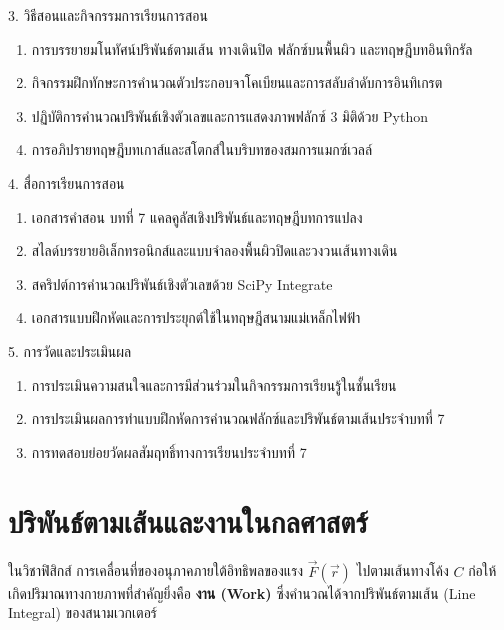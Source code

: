 \newpage

\begin{planbox}[colframe=rbruNavy!85!black, colbacktitle=rbruNavy!85!black]{3. วิธีสอนและกิจกรรมการเรียนการสอน}
\begin{enumerate}[topsep=2pt, itemsep=1pt, partopsep=0pt, parsep=0pt, leftmargin=1.5em]
    \item การบรรยายมโนทัศน์ปริพันธ์ตามเส้น ทางเดินปิด ฟลักซ์บนพื้นผิว และทฤษฎีบทอินทิกรัล
    \item กิจกรรมฝึกทักษะการคำนวณตัวประกอบจาโคเบียนและการสลับลำดับการอินทิเกรต
    \item ปฏิบัติการคำนวณปริพันธ์เชิงตัวเลขและการแสดงภาพฟลักซ์ 3 มิติด้วย Python
    \item การอภิปรายทฤษฎีบทเกาส์และสโตกส์ในบริบทของสมการแมกซ์เวลล์
\end{enumerate}
\end{planbox}

\begin{planbox}[colframe=rbruGold!90!black, colbacktitle=rbruGold!90!black]{4. สื่อการเรียนการสอน}
\begin{enumerate}[topsep=2pt, itemsep=1pt, partopsep=0pt, parsep=0pt, leftmargin=1.5em]
    \item เอกสารคำสอน บทที่ 7 แคลคูลัสเชิงปริพันธ์และทฤษฎีบทการแปลง
    \item สไลด์บรรยายอิเล็กทรอนิกส์และแบบจำลองพื้นผิวปิดและวงวนเส้นทางเดิน
    \item สคริปต์การคำนวณปริพันธ์เชิงตัวเลขด้วย SciPy Integrate
    \item เอกสารแบบฝึกหัดและการประยุกต์ใช้ในทฤษฎีสนามแม่เหล็กไฟฟ้า
\end{enumerate}
\end{planbox}

\begin{planbox}[colframe=rbruSlate, colbacktitle=rbruSlate]{5. การวัดและประเมินผล}
\begin{enumerate}[topsep=2pt, itemsep=1pt, partopsep=0pt, parsep=0pt, leftmargin=1.5em]
    \item การประเมินความสนใจและการมีส่วนร่วมในกิจกรรมการเรียนรู้ในชั้นเรียน
    \item การประเมินผลการทำแบบฝึกหัดการคำนวณฟลักซ์และปริพันธ์ตามเส้นประจำบทที่ 7
    \item การทดสอบย่อยวัดผลสัมฤทธิ์ทางการเรียนประจำบทที่ 7
\end{enumerate}
\end{planbox}
\clearpage

\section{ปริพันธ์ตามเส้นและงานในกลศาสตร์}
ในวิชาฟิสิกส์ การเคลื่อนที่ของอนุภาคภายใต้อิทธิพลของแรง $\vec{F}(\vec{r})$ ไปตามเส้นทางโค้ง $C$ ก่อให้เกิดปริมาณทางกายภาพที่สำคัญยิ่งคือ \textbf{งาน (Work)} ซึ่งคำนวณได้จากปริพันธ์ตามเส้น (Line Integral) ของสนามเวกเตอร์

